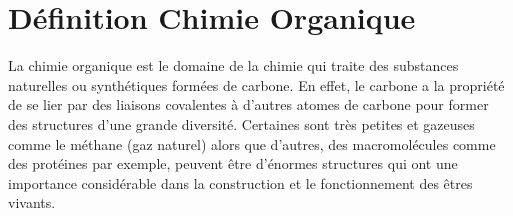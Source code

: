 \documentclass[a4paper, oneside]{book}
\begin{document}
\section*{Définition Chimie Organique}

La chimie organique est le domaine de la chimie qui traite des substances naturelles ou synthétiques formées de carbone. En effet, le carbone a la propriété de se lier par des  liaisons covalentes à d'autres atomes de carbone pour former des structures d’une grande diversité. Certaines sont très petites et gazeuses comme le méthane (gaz naturel) alors que d'autres, des macromolécules comme des protéines par exemple, peuvent être d'énormes structures qui ont une importance considérable dans la construction et le fonctionnement des êtres vivants.
\vspace*{\fill}
















\end{document}
